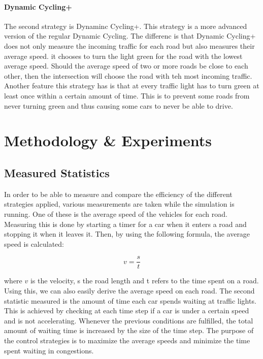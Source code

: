 \documentclass[11pt]{article}
\begin{document}
\paragraph{Dynamic Cycling+} The second strategy is Dynaminc Cycling+. This strategy is a more advanced version of the regular Dynamic Cycling. The differenc is that Dynamic Cycling+ does not only measure the incoming traffic for each road but also measures their average speed. it chooses to turn the light green for the road with the lowest average speed. Should the average speed of two or more roads be close to each other, then the intersection will choose the road with teh most incoming traffic. Another feature this strategy has is that at every traffic light has to turn green at least once within a certain amount of time. This is to prevent some roads from never turning green and thus causing some cars to never be able to drive.

\section{Methodology \& Experiments}
\label{sec:experiments}

\subsection{Measured Statistics}
In order to be able to measure and compare the efficiency of the different strategies applied, various measurements are taken while the simulation is running. One of these is the average speed of the vehicles for each road. Measuring this is done by starting a timer for a car when it enters a road and stopping it when it leaves it. Then, by using the following formula, the average speed is calculated:   

\begin{equation}
	v = \frac{s}{t}
\end{equation}

where $v$ is the velocity, s the road length and t refers to the time spent on a road. Using this, we can also easily derive the average speed on each road. The second statistic measured is the amount of time each car spends waiting at traffic lights. This is achieved by checking at each time step if a car is under a certain speed and is not accelerating. Whenever the previous conditions are fulfilled, the total amount of waiting time is increased by the size of the time step. The purpose of the control strategies is to maximize the average speeds and minimize the time spent waiting in congestions.
\end{document}
